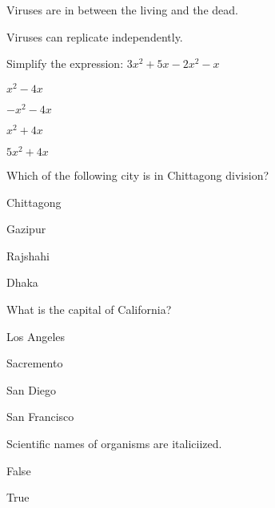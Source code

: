 \documentclass[12pt]{exam}
\begin{document}
\begin{questions}
\begin{oneparchoices}
            \choice Viruses are in between the living and the dead.
        
            \choice Viruses can replicate independently.
        
        \end{oneparchoices}

    \question Simplify the expression: $3x^2 + 5x - 2x^2 - x$
    
        \begin{oneparchoices}
        
            \choice $x^2 - 4x$
        
            \choice $-x^2 - 4x$
        
            \choice $x^2 + 4x$
        
            \choice $5x^2 + 4x$
        
        \end{oneparchoices}

    \question Which of the following city is in Chittagong division?
    
        \begin{oneparchoices}
        
            \choice Chittagong
        
            \choice Gazipur
        
            \choice Rajshahi
        
            \choice Dhaka
        
        \end{oneparchoices}

    \question What is the capital of California?
    
        \begin{oneparchoices}
        
            \choice Los Angeles
        
            \choice Sacremento
        
            \choice San Diego
        
            \choice San Francisco
        
        \end{oneparchoices}

    \question Scientific names of organisms are italiciized.
    
        \begin{oneparchoices}
        
            \choice False
        
            \choice True
        

\end{oneparchoices}
\end{questions}
\end{document}
